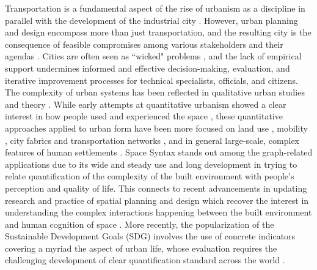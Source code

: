Transportation is a fundamental aspect of the rise of urbanism as a discipline \citep{Cerda1867} in parallel with the development of the industrial city \citep{CIAM1933}. However, urban planning and design encompass more than just transportation, and the resulting city is the consequence of feasible compromises among various stakeholders and their agendas \citep{Zografos2020}. Cities are often seen as ``wicked" problems \citep{Rittel1973}, and the lack of empirical support undermines informed and effective decision-making, evaluation, and iterative improvement processes for technical specialists, officials, and citizens. The complexity of urban systems has been reflected in qualitative urban studies and theory \citep{Lynch1960, Jacobs1961, Christopher1965}. While early attempts at quantitative urbanism showed a clear interest in how people used and experienced the space \citep{Whyte1979, Ewing2013}, these quantitative approaches applied to urban form have been more focused on land use \citep{Parker2003, White2015}, mobility \citep{Barbosa2018HumanApplications}, city fabrics and transportation networks \citep{Boeing2019UrbanSpatialOrder,Xie2009,Zanin2018}, and in general large-scale, complex features of human settlements \citep{Batty2008CitiesComplexSys, Bettencourt2007, Schlapfer2015, Schlapfer2020}. Space Syntax \citep{Hillier1984} stands out among the graph-related applications due to its wide and steady use and long development in trying to relate quantification of the complexity of the built environment with people's perception and quality of life. This connects to recent advancements in updating research and practice of spatial planning and design which recover the interest in understanding the complex interactions happening between the built environment and human cognition of space \citep{Piaget1948, Li2016, Arnheim1954, Derix2013, Dubey2023}.
More recently, the popularization of the Sustainable Development Goals (SDG) involves the use of concrete indicators covering a myriad the aspect of urban life, whose evaluation requires the challenging  development of clear quantification standard across the world \citep{Mair2018,Tzachor2022}.  

